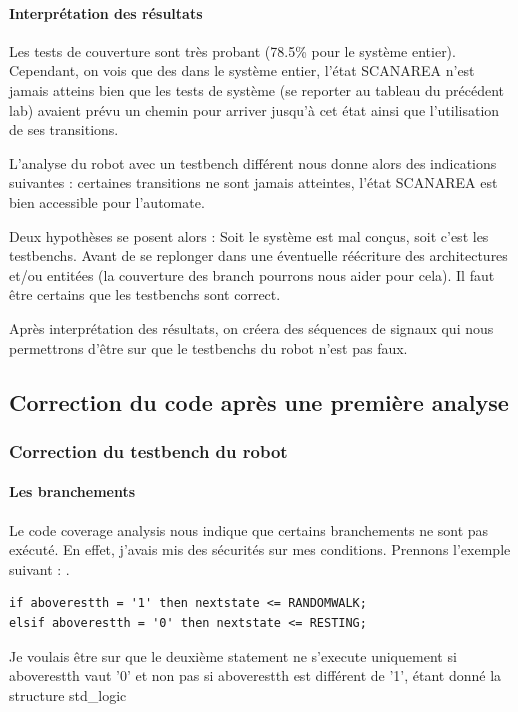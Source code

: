 \documentclass{article}
\newcommand{\sautligne}{
\textbf{\vspace{5mm}}
}
\begin{document}
\paragraph{Interprétation des résultats}
Les tests de couverture sont très probant (78.5\% pour le système entier). Cependant, on vois que des dans le système entier, l'état SCANAREA n'est jamais atteins bien que les tests de système (se reporter au tableau du précédent lab) avaient prévu un chemin pour arriver jusqu'à cet état ainsi que l'utilisation de ses transitions. 

L'analyse du robot avec un testbench différent nous donne alors des indications suivantes : certaines transitions ne sont jamais atteintes, l'état SCANAREA est bien accessible pour l'automate. 
\sautligne

Deux hypothèses se posent alors : Soit le système est mal conçus, soit c'est les testbenchs. Avant de se replonger dans une éventuelle réécriture des architectures et/ou entitées (la couverture des branch pourrons nous aider pour cela). Il faut être certains que les testbenchs sont correct.

Après interprétation des résultats, on créera des séquences de signaux qui nous permettrons d'être sur que le testbenchs du robot n'est pas faux.



\subsection{Correction du code après une première analyse }

\subsubsection{Correction du testbench du robot}

\paragraph{Les branchements}

Le code coverage analysis nous indique que certains branchements ne sont pas exécuté. En effet, j'avais mis des sécurités sur mes conditions. Prennons l'exemple suivant : .

\begin{verbatim}
if aboverestth = '1' then nextstate <= RANDOMWALK;
elsif aboverestth = '0' then nextstate <= RESTING;
\end{verbatim} 

Je voulais être sur que le deuxième statement ne s'execute uniquement si aboverestth vaut '0' et non pas si aboverestth est différent de '1', étant donné la structure std\_logic
\end{document}
